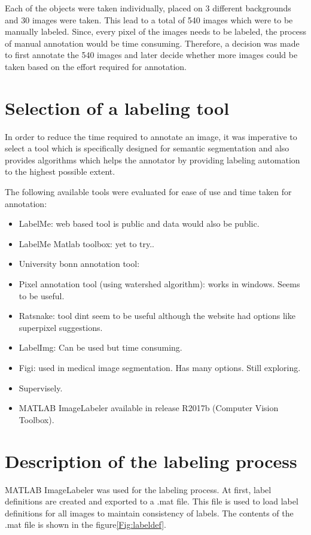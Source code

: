 \documentclass[paper=a4,11pt,parskip=half,toc=listof]{scrartcl}
\begin{document}
Each of the objects were taken individually, placed on 3 different backgrounds and 30 images were taken. This lead to a total of 540 images which were to be manually labeled. Since, every pixel of the images needs to be labeled, the process of manual annotation would be time consuming. Therefore, a decision was made to first annotate the 540 images and later decide whether more images could be taken based on the effort required for annotation.

\section{Selection of a labeling tool}
In order to reduce the time required to annotate an image, it was imperative to select a tool which is specifically designed for semantic segmentation and also provides algorithms which helps the annotator by providing labeling automation to the highest possible extent.

The following available tools were evaluated for ease of use and time taken for annotation:
	\begin{itemize}
		\item LabelMe: web based tool is public and data would also be public.
		\item LabelMe Matlab toolbox: yet to try..
		\item University bonn annotation tool:
		\item Pixel annotation tool (using watershed algorithm): works in windows. Seems to be useful.
		\item Ratsnake: tool dint seem to be useful although the website had options like superpixel suggestions.
		\item LabelImg: Can be used but time consuming.
		\item Figi: used in medical image segmentation. Has many options. Still exploring.
		\item Supervisely.
		\item MATLAB ImageLabeler available in release R2017b (Computer Vision Toolbox).
	\end{itemize}

\section{Description of the labeling process}
\label{section:process}
MATLAB ImageLabeler was used for the labeling process. At first, label definitions are created and exported to a .mat file. This file is used to load label definitions for all images to maintain consistency of labels. The contents of the .mat file is shown in the figure\ref{Fig:labeldef}.
\end{document}
